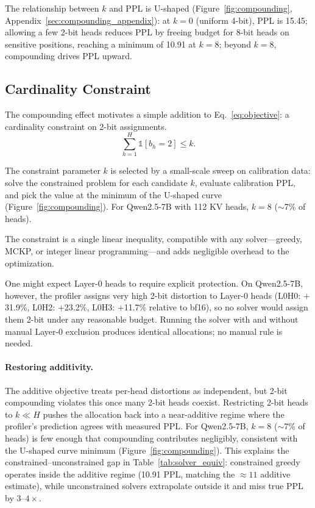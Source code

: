 The relationship between $k$ and PPL is U-shaped (Figure~\ref{fig:compounding}, Appendix~\ref{sec:compounding_appendix}): at $k{=}0$ (uniform 4-bit), PPL is 15.45; allowing a few 2-bit heads reduces PPL by freeing budget for 8-bit heads on sensitive positions, reaching a minimum of 10.91 at $k{=}8$; beyond $k{=}8$, compounding drives PPL upward.

\subsection{Cardinality Constraint}
\label{sec:cardinality}

The compounding effect motivates a simple addition to Eq.~\eqref{eq:objective}: a cardinality constraint on 2-bit assignments.
\begin{equation}
\label{eq:constraint}
\sum_{h=1}^{H} \mathbb{1}[b_h = 2] \leq k.
\end{equation}

The constraint parameter $k$ is selected by a small-scale sweep on calibration data: solve the constrained problem for each candidate $k$, evaluate calibration PPL, and pick the value at the minimum of the U-shaped curve (Figure~\ref{fig:compounding}).
For Qwen2.5-7B with 112 KV heads, $k{=}8$ ($\sim$7\% of heads).

The constraint is a single linear inequality, compatible with any solver---greedy, MCKP, or integer linear programming---and adds negligible overhead to the optimization.

One might expect Layer-0 heads to require explicit protection.
On Qwen2.5-7B, however, the profiler assigns very high 2-bit distortion to Layer-0 heads (L0H0: $+$31.9\%, L0H2: $+$23.2\%, L0H3: $+$11.7\% relative to bf16), so no solver would assign them 2-bit under any reasonable budget.
Running the solver with and without manual Layer-0 exclusion produces identical allocations; no manual rule is needed.

\paragraph{Restoring additivity.}
The additive objective treats per-head distortions as independent, but 2-bit compounding violates this once many 2-bit heads coexist.
Restricting 2-bit heads to $k \ll H$ pushes the allocation back into a near-additive regime where the profiler's prediction agrees with measured PPL.
For Qwen2.5-7B, $k{=}8$ ($\sim$7\% of heads) is few enough that compounding contributes negligibly, consistent with the U-shaped curve minimum (Figure~\ref{fig:compounding}).
This explains the constrained--unconstrained gap in Table~\ref{tab:solver_equiv}: constrained greedy operates inside the additive regime (10.91 PPL, matching the ${\approx}11$ additive estimate), while unconstrained solvers extrapolate outside it and miss true PPL by $3\text{--}4\times$.

